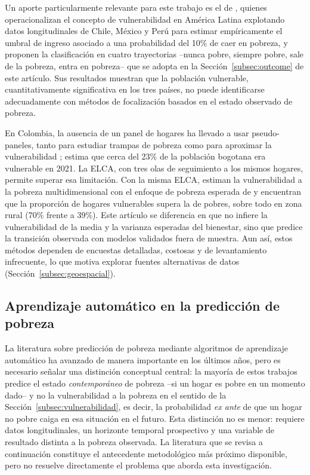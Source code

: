 \documentclass[12pt, letterpaper]{article}
\begin{document}
Un aporte particularmente relevante para este trabajo es el de
\textcite{lopezCalva2011,lopezCalva2014}, quienes operacionalizan el
concepto de vulnerabilidad en América Latina explotando datos
longitudinales de Chile, México y Perú para estimar empíricamente el
umbral de ingreso asociado a una probabilidad del 10\% de caer en
pobreza, y proponen la clasificación en cuatro trayectorias --nunca
pobre, siempre pobre, sale de la pobreza, entra en pobreza-- que se
adopta en la Sección~\ref{subsec:outcome} de este artículo. Sus
resultados muestran que la población vulnerable, cuantitativamente
significativa en los tres países, no puede identificarse adecuadamente
con métodos de focalización basados en el estado observado de pobreza.

En Colombia, la ausencia de un panel de hogares ha llevado a usar
pseudo-paneles, tanto para estudiar trampas de pobreza
\parencite{castaneda2012} como para aproximar la vulnerabilidad
\parencite{gaitan2023};
\textcite{gaitan2023} estima que cerca del 23\% de la población bogotana
era vulnerable en 2021. La ELCA, con tres olas de seguimiento a los
mismos hogares, permite superar esa limitación. Con la misma ELCA,
\textcite{hernandez2022} estiman la vulnerabilidad a la pobreza
multidimensional con el enfoque de pobreza esperada de
\textcite{chaudhuri2002} y encuentran que la proporción de hogares
vulnerables supera la de pobres, sobre todo en zona rural (70\% frente a
39\%). Este artículo se diferencia en que no infiere la vulnerabilidad de
la media y la varianza esperadas del bienestar, sino que predice la
transición observada con modelos validados fuera de muestra. Aun así, estos métodos
dependen de encuestas detalladas, costosas y de levantamiento
infrecuente, lo que motiva explorar fuentes alternativas de datos
(Sección~\ref{subsec:geoespacial}).

\subsection{Aprendizaje automático en la predicción de pobreza}
\label{subsec:ml_pobreza}

La literatura sobre predicción de pobreza mediante algoritmos de
aprendizaje automático ha avanzado de manera importante en los últimos
años, pero es necesario señalar una distinción conceptual central: la
mayoría de estos trabajos predice el estado \emph{contemporáneo} de
pobreza --si un hogar es pobre en un momento dado-- y no la vulnerabilidad
a la pobreza en el sentido de la Sección~\ref{subsec:vulnerabilidad}, es
decir, la probabilidad \emph{ex ante} de que un hogar no pobre caiga en
esa situación en el futuro. Esta distinción no es menor: requiere datos
longitudinales, un horizonte temporal prospectivo y una variable de
resultado distinta a la pobreza observada. La literatura que se revisa a
continuación constituye el antecedente metodológico más próximo
disponible, pero no resuelve directamente el problema que aborda esta
investigación.
\end{document}
